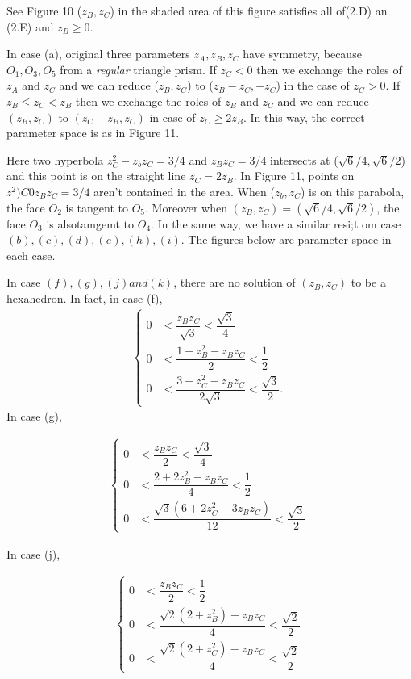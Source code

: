 \documentclass[dvipdfmx]{interact}
\theoremstyle{plain}%
\theoremstyle{definition}
\theoremstyle{remark}
\theoremstyle{problemstyle}
\begin{document}
See Figure 10 ($z_B, z_C$) in the shaded area of this figure  satisfies
all of(2.D) an (2.E) and $z_B \geq 0$.

In case (a), original three parameters $z_A, z_B, z_C$ have symmetry,
because $O_1, O_3, O_5$ from a \textit{regular} triangle prism.
If $z_C < 0$ then we exchange the roles of $z_A$ and $z_C$ and we can reduce
($z_B, z_C$) to ($z_B - z_C, -z_C$) in the case of $z_C > 0$.
If $z_B \leq z_C < z_B$ then we exchange the roles of $z_B$ and $z_C$
and we can reduce $(z_B, z_C)$ to $(z_C -z_B,z_C)$ in case of 
$z_C \geq 2z_B$. In this way, the correct parameter space is as in Figure
11.

Here two hyperbola $z^2_C - z_bz_C = 3/4$ and $z_B z_C = 3/4$ intersects
at ($\sqrt{6} / 4, \sqrt{6}/2$) and this point is on the straight line
$z_C=2z_B$. In Figure 11, points on $z^2)C 0 z_Bz_C = 3/4$ aren't
contained in the area. When ($z_b, z_C$) is on this parabola, the face
$O_2$ is tangent to $O_5$. Moreover when
$(z_B, z_C) = (\sqrt{6} / 4, \sqrt{6}/2)$, the face $O_3$ is alsotamgemt
to $O_4$.
In the same way, we have a similar resi;t om case $(b), (c), (d), (e),
(h), (i)$. The figures below are parameter space in each case.

In case $(f), (g), (j) and (k)$, there are no solution of $(z_B, z_C)$
to be a hexahedron. In fact, in case (f),
\begin{align*}
\begin{cases}
 0 &< \dfrac{z_Bz_C}{\sqrt{3}} < \dfrac{\sqrt{3}}{4} \\
 0 &< \dfrac{1 + z^2_B - z_Bz_C}{2} < \dfrac{1}{2} \\
 0 &< \dfrac{3 + z^2_C - z_Bz_C}{2\sqrt{3}} < \dfrac{\sqrt{3}}{2}.
\end{cases}
\end{align*}
In case (g),

\begin{align*}
\begin{cases}
0 &< \dfrac{z_Bz_C}{2} < \dfrac{\sqrt{3}}{4} \\
0 &< \dfrac{2 + 2z^2_B - z_Bz_C}{4} < \dfrac{1}{2} \\
0 &< \dfrac{\sqrt{3}(6 + 2z^2_C - 3z_Bz_C)}{12} < \dfrac{\sqrt{3}}{2}
\end{cases}
\end{align*}

In case (j),

\begin{align*}
 \begin{cases}
  0 &< \dfrac{z_Bz_C}{2} < \dfrac{1}{2}\\
  0 &< \dfrac{\sqrt{2}(2 + z^2_B) - z_B z_C}{4} < \dfrac{\sqrt{2}}{2}\\
  0 &< \dfrac{\sqrt{2}(2 + z^2_C) - z_B z_C}{4} < \dfrac{\sqrt{2}}{2}
 \end{cases}
\end{align*}
\end{document}
